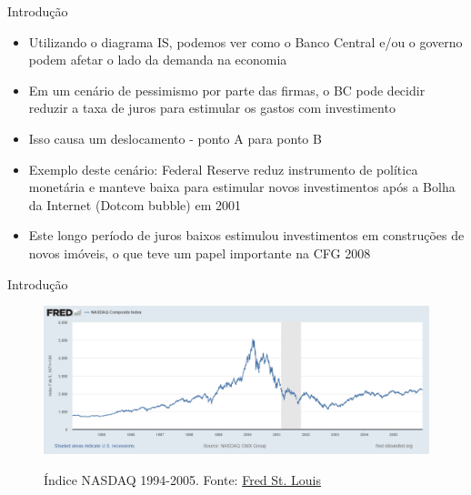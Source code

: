 \documentclass[10pt]{beamer}
\begin{document}
\begin{frame}{Introdução}
    \begin{itemize}
        \item Utilizando o diagrama IS, podemos ver como o Banco Central e/ou o governo podem afetar o lado da demanda na economia\bigskip

        \item Em um cenário de pessimismo por parte das firmas, o BC pode decidir reduzir a taxa de juros para estimular os gastos com investimento\bigskip

        \item Isso causa um deslocamento  - ponto A para ponto B\bigskip

        \item Exemplo deste cenário: Federal Reserve reduz instrumento de política monetária e manteve baixa para estimular novos investimentos após a Bolha da Internet (Dotcom bubble) em 2001\bigskip

        \item Este longo período de juros baixos estimulou investimentos em construções de novos imóveis, o que teve um papel importante na CFG 2008
    \end{itemize}
\end{frame}

\begin{frame}{Introdução}    
    \begin{figure}
        \centering
        \href{https://fred.stlouisfed.org/series/NASDAQCOM}{\includegraphics[width=\textwidth]{./figures/aula6_fig2.png}}
        \caption{Índice NASDAQ 1994-2005. Fonte: \href{https://fred.stlouisfed.org/series/NASDAQCOM}{Fred St. Louis}}
        \label{aula6_fig2}
    \end{figure}
\end{frame}
\end{document}
